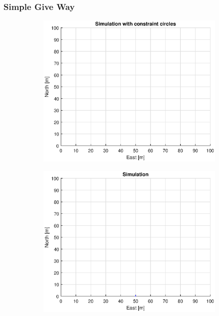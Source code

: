 \subsubsection{Simple Give Way}
\begin{figure}[!b] %
    \begin{subfigure}[b]{0.49\textwidth}
        \centering
        \includegraphics[width=\textwidth]{Images/Figures/Enkel_GW/Simple0_f1_Frame1}
    \end{subfigure}
    \hfill
    \begin{subfigure}[b]{0.499\textwidth}
        \centering
        \includegraphics[width=\textwidth]{Images/Figures/Enkel_GW/Simple0_f600_Frame1}

\end{subfigure}
\end{figure}
